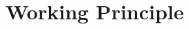 \documentclass[conference]{IEEEtran}
\begin{document}
%
%


%





\section{Working Principle}
\end{document}
